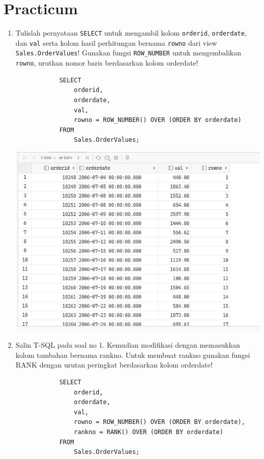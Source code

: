 \documentclass[12pt,titlepage]{article}
\begin{document}
\section{Practicum}
\begin{enumerate}
    \item {
        Tulislah pernyataan \texttt{SELECT} untuk mengambil kolom \texttt{orderid}, \texttt{orderdate}, dan \texttt{val} serta
        kolom hasil perhitungan bernama \texttt{rowno} dari view \texttt{Sales.OrderValues}! Gunakan fungsi
        \texttt{ROW\_NUMBER} untuk mengembalikan \texttt{rowno}, urutkan nomor baris berdasarkan kolom
        orderdate!
        
        \begin{verbatim}
            SELECT
                orderid,
                orderdate,
                val,
                rowno = ROW_NUMBER() OVER (ORDER BY orderdate)
            FROM
                Sales.OrderValues;
        \end{verbatim}

        \begin{center}
            \includegraphics[width=.8\textwidth]{./images/1.png}
        \end{center}
    }
    \pagebreak
    \item {
        Salin T-SQL pada soal no 1. Kemudian modifikasi dengan memasukkan kolom tambahan
        bernama rankno. Untuk membuat rankno gunakan fungsi RANK dengan urutan peringkat
        berdasarkan kolom orderdate!

        \begin{verbatim}
            SELECT
                orderid,
                orderdate,
                val,
                rowno = ROW_NUMBER() OVER (ORDER BY orderdate),
                rankno = RANK() OVER (ORDER BY orderdate)
            FROM
                Sales.OrderValues;
        \end{verbatim}
    
}
\end{enumerate}
\end{document}
